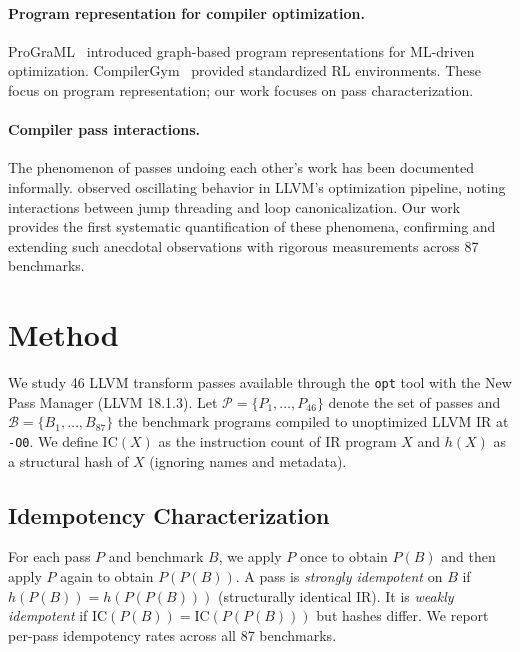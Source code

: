 \documentclass[11pt]{article}
\begin{document}
\paragraph{Program representation for compiler optimization.}
ProGraML~\citep{cummins2021programl} introduced graph-based program representations for ML-driven optimization. CompilerGym~\citep{cummins2021compilergym} provided standardized RL environments. These focus on program representation; our work focuses on pass characterization.

\paragraph{Compiler pass interactions.}
The phenomenon of passes undoing each other's work has been documented informally. \citet{regehr2018llvm} observed oscillating behavior in LLVM's optimization pipeline, noting interactions between jump threading and loop canonicalization. Our work provides the first systematic quantification of these phenomena, confirming and extending such anecdotal observations with rigorous measurements across 87 benchmarks.

\section{Method}
\label{sec:method}

We study 46 LLVM transform passes available through the \texttt{opt} tool with the New Pass Manager (LLVM 18.1.3). Let $\mathcal{P} = \{P_1, \ldots, P_{46}\}$ denote the set of passes and $\mathcal{B} = \{B_1, \ldots, B_{87}\}$ the benchmark programs compiled to unoptimized LLVM IR at \texttt{-O0}. We define $\text{IC}(X)$ as the instruction count of IR program $X$ and $h(X)$ as a structural hash of $X$ (ignoring names and metadata).

\subsection{Idempotency Characterization}

For each pass $P$ and benchmark $B$, we apply $P$ once to obtain $P(B)$ and then apply $P$ again to obtain $P(P(B))$. A pass is \emph{strongly idempotent} on $B$ if $h(P(B)) = h(P(P(B)))$ (structurally identical IR). It is \emph{weakly idempotent} if $\text{IC}(P(B)) = \text{IC}(P(P(B)))$ but hashes differ. We report per-pass idempotency rates across all 87 benchmarks.
\end{document}
